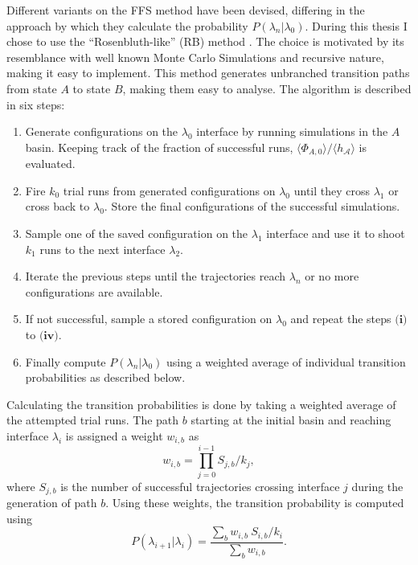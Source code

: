 Different variants on the FFS method have been devised, differing in the approach by
which they calculate the probability $P(\lambda_n|\lambda_0)$. During this thesis I
chose to use the “Rosenbluth-like” (RB) method \cite{Allen2006}. The choice
is motivated
by its resemblance with well known Monte Carlo Simulations and recursive nature, making
it easy to implement.  This method generates unbranched transition paths from state $A$
to state $B$, making them easy to analyse. The algorithm is described in six steps:
\begin{enumerate}[label=\textbf{(\roman*)}]
   \item Generate configurations on the $\lambda_0$ interface by running
      simulations in the $A$ basin. Keeping track of the fraction of successful runs,
      $\langle\Phi_{A,0} \rangle/\langle h_{\mathcal{A}}\rangle$ is evaluated.
   \item Fire $k_0$ trial runs from generated configurations on $\lambda_0$ until they
      cross $\lambda_1$ or cross back to $\lambda_0$. Store the final configurations of
      the successful simulations.
   \item Sample one of the saved configuration on the $\lambda_1$ interface and use it to
      shoot $k_1$ runs to the next interface $\lambda_2$.
   \item Iterate the previous steps until the trajectories reach $\lambda_n$ or no more
     configurations are available.
   \item If not successful, sample a stored configuration on $\lambda_0$ and repeat the
      steps $\textbf{(i)}$ to $\textbf{(iv)}$.
   \item Finally compute $P(\lambda_n|\lambda_0)$ using a weighted average of individual
     transition probabilities as described below.
\end{enumerate}
Calculating the transition probabilities is done by taking a weighted average of the
attempted trial runs. The path $b$ starting at the initial basin and reaching
interface $\lambda_i$ is assigned a weight $w_{i,b}$ as
\begin{equation}
   w_{i,b} = \prod_{j=0}^{i-1} S_{j,b}/k_j,
\end{equation}
where $S_{j,b}$ is the number of successful trajectories crossing interface $j$ during
the generation of path $b$. Using these weights, the transition probability is computed
using
\begin{equation}
   P(\lambda_{i+1} | \lambda_i) = \frac{\sum_{b} w_{i,b}\ S_{i,b}/k_i}{\sum_b w_{i,b}}.
\end{equation}

